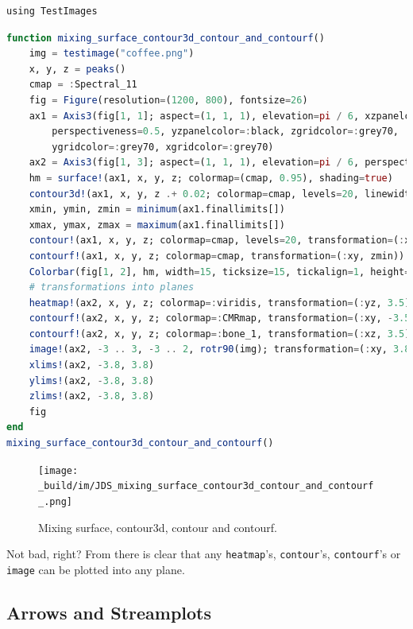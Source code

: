 \documentclass[
  notoc %
]{tufte-book}
\newcommand{\passthrough}[1]{#1}
\begin{document}
\begin{lstlisting}
using TestImages
\end{lstlisting}

\begin{lstlisting}[language=Julia]
function mixing_surface_contour3d_contour_and_contourf()
    img = testimage("coffee.png")
    x, y, z = peaks()
    cmap = :Spectral_11
    fig = Figure(resolution=(1200, 800), fontsize=26)
    ax1 = Axis3(fig[1, 1]; aspect=(1, 1, 1), elevation=pi / 6, xzpanelcolor=(:black, 0.75),
        perspectiveness=0.5, yzpanelcolor=:black, zgridcolor=:grey70,
        ygridcolor=:grey70, xgridcolor=:grey70)
    ax2 = Axis3(fig[1, 3]; aspect=(1, 1, 1), elevation=pi / 6, perspectiveness=0.5)
    hm = surface!(ax1, x, y, z; colormap=(cmap, 0.95), shading=true)
    contour3d!(ax1, x, y, z .+ 0.02; colormap=cmap, levels=20, linewidth=2)
    xmin, ymin, zmin = minimum(ax1.finallimits[])
    xmax, ymax, zmax = maximum(ax1.finallimits[])
    contour!(ax1, x, y, z; colormap=cmap, levels=20, transformation=(:xy, zmax))
    contourf!(ax1, x, y, z; colormap=cmap, transformation=(:xy, zmin))
    Colorbar(fig[1, 2], hm, width=15, ticksize=15, tickalign=1, height=Relative(0.35))
    # transformations into planes
    heatmap!(ax2, x, y, z; colormap=:viridis, transformation=(:yz, 3.5))
    contourf!(ax2, x, y, z; colormap=:CMRmap, transformation=(:xy, -3.5))
    contourf!(ax2, x, y, z; colormap=:bone_1, transformation=(:xz, 3.5))
    image!(ax2, -3 .. 3, -3 .. 2, rotr90(img); transformation=(:xy, 3.8))
    xlims!(ax2, -3.8, 3.8)
    ylims!(ax2, -3.8, 3.8)
    zlims!(ax2, -3.8, 3.8)
    fig
end
mixing_surface_contour3d_contour_and_contourf()
\end{lstlisting}

\begin{figure}
\hypertarget{fig:mixing_surface_contour3d_contour_and_contourf}{%
\centering
\texttt{[image: \_build/im/JDS\_mixing\_surface\_contour3d\_contour\_and\_contourf\_.png]}
\caption{Mixing surface, contour3d, contour and
contourf.}\label{fig:mixing_surface_contour3d_contour_and_contourf}
}
\end{figure}

Not bad, right? From there is clear that any
\passthrough{\lstinline!heatmap!}'s,
\passthrough{\lstinline!contour!}'s,
\passthrough{\lstinline!contourf!}'s or \passthrough{\lstinline!image!}
can be plotted into any plane.

\hypertarget{arrows-and-streamplots}{%
\subsection{Arrows and Streamplots}\label{arrows-and-streamplots}}
\end{document}

